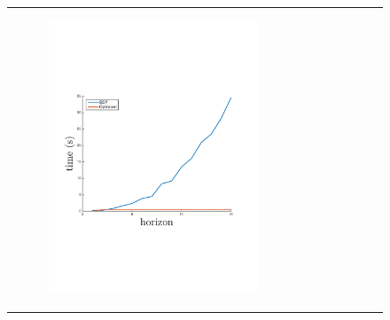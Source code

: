 \documentclass[letterpaper]{article}
\begin{document}
\label{sec:time_space}

{\centering
\begin{figure}[]
    \begin{tabular}{cc}
        \begin{subfigure}{0.45\columnwidth}
            \centering 
            \includegraphics[width=\columnwidth,height=0.12\textheight]{images/time_plot_new}
            \label{fig:time_complexity}
        \end{subfigure} &
        \begin{subfigure}{0.45\columnwidth}
            \centering 

\end{subfigure}
\end{tabular}
\end{figure}}
\end{document}
